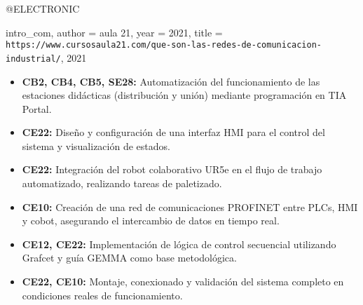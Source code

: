 @ELECTRONIC{intro_com,
  author = {{aula 21}},
  year = {2021},
  title = {\texttt{https://www.cursosaula21.com/que-son-las-redes-de-comunicacion-industrial/}, 2021}
  
  
  
  
  \begin{itemize}
	\item \textbf{CB2, CB4, CB5, SE28:} Automatización del funcionamiento de las estaciones didácticas (distribución y unión) mediante programación en TIA Portal.

	\item \textbf{CE22:} Diseño y configuración de una interfaz HMI para el control del sistema y visualización de estados.

	\item\textbf{CE22:} Integración del robot colaborativo UR5e en el flujo de trabajo automatizado, realizando tareas de paletizado.

	\item \textbf{CE10:} Creación de una red de comunicaciones PROFINET entre PLCs, HMI y cobot, asegurando el intercambio de datos en tiempo real.

	\item \textbf{CE12, CE22:} Implementación de lógica de control secuencial utilizando Grafcet y guía GEMMA como base metodológica.

	\item \textbf{CE22, CE10:} Montaje, conexionado y validación del sistema completo en condiciones reales de funcionamiento.
\end{itemize}
}